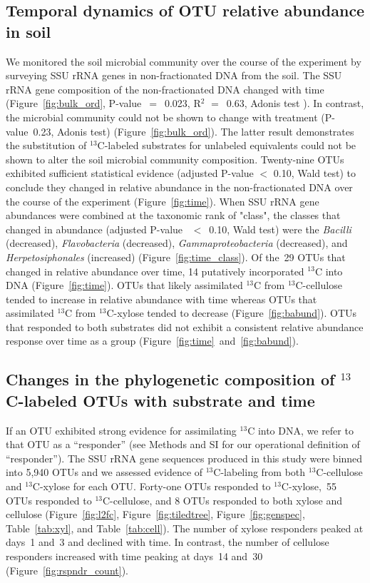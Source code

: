 \subsection{Temporal dynamics of OTU relative abundance in soil}
We monitored the soil microbial community over the course of the
experiment by surveying SSU rRNA genes in non-fractionated DNA from the
soil. The SSU rRNA gene composition of the non-fractionated DNA
changed with time (Figure~\ref{fig:bulk_ord}, P-value~$=$~0.023, R$^{2}$
$=$~0.63, Adonis test \citep{Anderson2001a}). In contrast, the microbial
community could not be shown to change with treatment
 (P-value~0.23, Adonis test) (Figure~\ref{fig:bulk_ord}). The latter
result demonstrates the substitution of $^{13}$C-labeled substrates for
unlabeled equivalents could not be shown to alter the soil microbial community
composition. Twenty-nine OTUs exhibited sufficient statistical evidence
(adjusted P-value $<$ 0.10, Wald test) to conclude they changed in relative
abundance in the non-fractionated DNA over the course of the experiment
(Figure~\ref{fig:time}). When SSU rRNA gene abundances were combined at the
taxonomic rank of "class", the classes that changed in abundance (adjusted
P-value~ $<$~0.10, Wald test) were the \textit{Bacilli} (decreased),
\textit{Flavobacteria} (decreased), \textit{Gammaproteobacteria} (decreased),
and \textit{Herpetosiphonales} (increased) (Figure~\ref{fig:time_class}). Of
the~29 OTUs that changed in relative abundance over time, 14 putatively
incorporated $^{13}$C into DNA (Figure~\ref{fig:time}). OTUs that likely
assimilated $^{13}$C from $^{13}$C-cellulose tended to increase in
relative abundance with time whereas OTUs that assimilated $^{13}$C from
$^{13}$C-xylose tended to decrease (Figure~\ref{fig:babund}). OTUs that
responded to both substrates did not exhibit a consistent relative abundance
response over time as a group (Figure~\ref{fig:time}~and~\ref{fig:babund}).

\subsection{Changes in the phylogenetic composition of $^{13}$C-labeled OTUs with substrate and time}
If an OTU exhibited strong evidence for assimilating $^{13}$C into DNA, we
refer to that OTU as a ``responder'' (see Methods and SI for our operational
definition of ``responder''). The SSU rRNA gene sequences produced in this study
were binned into 5,940 OTUs and we assessed evidence of $^{13}$C-labeling from
both $^{13}$C-cellulose and $^{13}$C-xylose for each OTU. Forty-one OTUs
responded to $^{13}$C-xylose,~55 OTUs responded to $^{13}$C-cellulose, and
8 OTUs responded to both xylose and cellulose (Figure~\ref{fig:l2fc},
Figure~\ref{fig:tiledtree}, Figure~\ref{fig:genspec}, Table~\ref{tab:xyl}, and
Table~\ref{tab:cell}). The number of xylose responders peaked at days~1 and~3
and declined with time. In contrast, the number of cellulose responders
increased with time peaking at days~14 and~30 (Figure~\ref{fig:rspndr_count}). 

